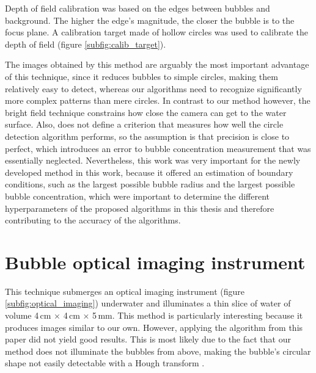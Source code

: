 	Depth of field calibration was based on the edges between bubbles and background. The higher the edge's magnitude, the closer the bubble is to the focus plane. A calibration target made of hollow circles was used to calibrate the depth of field (figure \ref{subfig:calib_target}). 
	
	The images obtained by this method are arguably the most important advantage of this technique, since it reduces bubbles to simple circles, making them relatively easy to detect, whereas our algorithms need to recognize significantly more complex patterns than mere circles.
	 In contrast to our method however, the bright field technique constrains how close the camera can get to the water surface. Also, \citet{Leonie} does not define a criterion that measures how well the circle detection algorithm performs, so the assumption is that precision is close to perfect, which introduces an error to bubble concentration measurement that was essentially neglected. 
	 Nevertheless, this work was very important for the newly developed method in this work, because it offered an estimation of boundary conditions, such as the largest possible bubble radius and the largest possible bubble concentration, which were important to determine the different hyperparameters of the proposed algorithms in this thesis and therefore contributing to the accuracy of the algorithms. 
	
	
\section{Bubble optical imaging instrument}
	This technique submerges an optical imaging instrument (figure \ref{subfig:optical_imaging}) underwater and illuminates a thin slice	of water of volume 4\,cm $\times$ 4\,cm $\times$ 5\,mm. This method is particularly interesting because it produces images similar to our own. However, applying the algorithm from this paper did not yield good results. This is most likely due to the fact that our method does not illuminate the bubbles from above, making the bubble's circular shape not easily detectable with a Hough transform \citep{Hough1972} \citep{Al-Lashi2016}.
	

